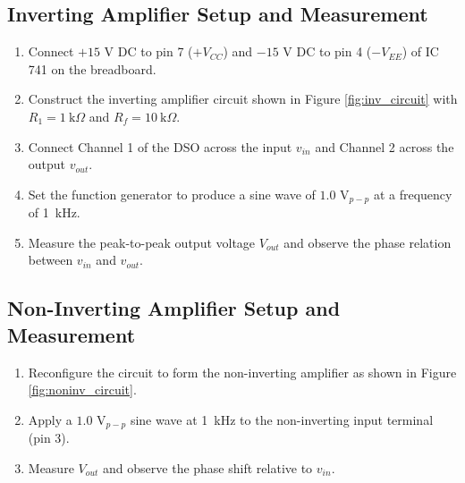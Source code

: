 \subsection{Inverting Amplifier Setup and Measurement}
\begin{enumerate}
	\item Connect $+15\text{ V}$ DC to pin 7 ($+V_{CC}$) and $-15\text{ V}$ DC to pin 4 ($-V_{EE}$) of IC 741 on the breadboard.
	\item Construct the inverting amplifier circuit shown in Figure \ref{fig:inv_circuit} with $R_1 = \SI{1}{\kilo\Omega}$ and $R_f = \SI{10}{\kilo\Omega}$.
	\item Connect Channel 1 of the DSO across the input $v_{in}$ and Channel 2 across the output $v_{out}$.
	\item Set the function generator to produce a sine wave of $1.0\text{ V}_{p-p}$ at a frequency of \SI{1}{\kilo\hertz}.
	\item Measure the peak-to-peak output voltage $V_{out}$ and observe the phase relation between $v_{in}$ and $v_{out}$.
\end{enumerate}

\subsection{Non-Inverting Amplifier Setup and Measurement}
\begin{enumerate}
	\item Reconfigure the circuit to form the non-inverting amplifier as shown in Figure \ref{fig:noninv_circuit}.
	\item Apply a $1.0\text{ V}_{p-p}$ sine wave at \SI{1}{\kilo\hertz} to the non-inverting input terminal (pin 3).
	\item Measure $V_{out}$ and observe the phase shift relative to $v_{in}$.
\end{enumerate}

